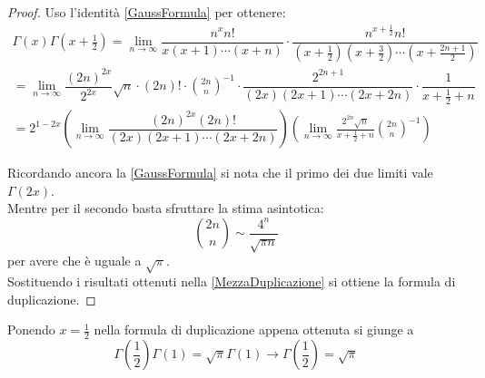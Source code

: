 \begin{proof}
Uso l'identità \cref{GaussFormula} per ottenere:
\begin{equation}
\label{MezzaDuplicazione}
\begin{split}
\Gamma(x)\Gamma\left(x+\frac12\right) = \lim_{n\to\infty} 
\dfrac{n^xn!}{x(x+1)\cdots (x+n)} \cdot \dfrac{n^{x+\frac12} n!}{\left(x+\frac12\right)\left(x+\frac32\right)\cdots \left(x+\frac{2n+1}2\right)}\\
 =\lim_{n\to\infty} \dfrac{(2n)^{2x}}{2^{2x}}\sqrt{n}\cdot (2n)!\cdot\binom{2n}{n}^{-1}\cdot \dfrac{2^{2n+1}}{(2x)(2x+1)\cdots(2x+2n)}\cdot \dfrac{1}{x+\frac12+n} \\
 =2^{1-2x} \left(\lim_{n\to\infty} \dfrac{ (2n)^{2x}(2n)! }{ (2x)(2x+1)\cdots(2x+2n) }\right) 
  \left( \lim_{n\to\infty} \frac{2^{2n}\sqrt{n}}{x+\frac12+n} \binom{2n}{n}^{-1}\right)
\end{split}
\end{equation}

Ricordando ancora la \cref{GaussFormula} si nota che il primo dei due limiti vale $\Gamma(2x)$.\\
Mentre per il secondo basta sfruttare la stima asintotica:
\begin{equation*}
	\binom{2n}{n}\sim \frac{4^n}{\sqrt{\pi n }}
\end{equation*}
per avere che è uguale a $\sqrt{\pi}$.\\
Sostituendo i risultati ottenuti nella \cref{MezzaDuplicazione} si ottiene la formula di duplicazione.
\end{proof}

\begin{remark}
Ponendo $x=\frac12$ nella formula di duplicazione appena ottenuta si giunge a 
\begin{equation*}
  \Gamma\left(\frac12\right)\Gamma(1)=\sqrt{\pi}\Gamma(1) \to \Gamma\left(\frac12\right)=\sqrt{\pi}
\end{equation*}
\end{remark}

